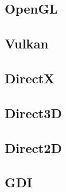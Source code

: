 \documentclass{article}
\begin{document}
\subsection{OpenGL}
\label{subsec:opengl}


\subsection{Vulkan}
\label{subsec:vulkan}


\subsection{DirectX}
\label{subsec:directx}


\subsection{Direct3D}
\label{subsec:direct3d}


\subsection{Direct2D}
\label{subsec:direct2d}


\subsection{GDI}
\label{subsec:windows-gdi}

\end{document}
